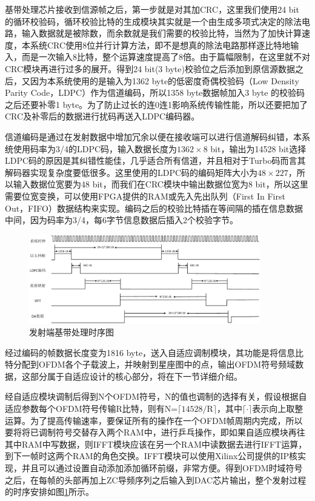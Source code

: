 基带处理芯片接收到信源帧之后，第一步就是对其加CRC，这里我们使用24 bit 的循环校验码，循环校验比特的生成模块其实就是一个由生成多项式决定的除法电路，输入数据就是被除数，而余数就是我们需要的校验比特，当然为了加快计算速度，本系统CRC使用8位并行计算方法，即不是想真的除法电路那样逐比特地输入，而是一次输入8比特，整个运算速度提高了8倍。由于篇幅限制，在这里就不对CRC模块再进行过多的展开。得到24 bit(3 byte)校验位之后添加到原信源数据之后，又因为本系统使用的是输入为1362 byte的低密度奇偶校验码（Low Density Parity Code，LDPC）作为信道编码，所以1358 byte数据帧加入3 byte 的校验码之后还要补零1 byte。为了防止过长的连0连1影响系统传输性能，所以还要把加了CRC及补零后的数据进行扰码再送入LDPC编码器。

信道编码是通过在发射数据中增加冗余以便在接收端可以进行信道解码纠错，本系统使用码率为3/4的LDPC码，输入数据长度为$1362\times 8$ bit，输出为14528 bit选择LDPC码的原因是其纠错性能佳，几乎适合所有信道，并且相对于Turbo码而言其解码器实现复杂度要低很多。这里使用的LDPC码的编码矩阵大小为$48\times 227$，所以输入数据位宽要为48 bit，而我们在CRC模块中输出数据位宽为8 bit，所以这里需要位宽变换，可以使用FPGA提供的RAM或先入先出队列（First In First Out，FIFO）数据结构来实现。编码之后的校验比特插在等间隔的插在信息数据中间，因为码率为3/4，每6字节信息数据后插入2个校验字节。

\begin{figure}[htbp]
\centering
\includegraphics[width=0.9\textwidth]{figures/chapter-5/TimeSchemeTrans.eps}
\caption{发射端基带处理时序图}
\label{fig:TimeSchemeTrans}
\end{figure}
经过编码的帧数据长度变为1816 byte，送入自适应调制模块，其功能是将信息比特分配到OFDM各个子载波上，并映射到星座图中的点，输出OFDM符号频域数据，这部分属于自适应设计的核心部分，将在下一节详细介绍。

经自适应模块调制后得到N个OFDM符号，N的值也调制的选择有关，假设根据自适应参数每个OFDM符号传输R比特，则有N=$\lceil 14528/\text{R} \rceil$，其中$\lceil \cdot \rceil$表示向上取整运算。为了提高传输速率，要保证所有的操作在一个OFDM帧周期内完成，所以要将将已调制符号交替存入两个RAM中，进行乒乓操作，即如果自适应模块再往其中RAM中写数据，则IFFT模块应该在另一个RAM中读数据去进行IFFT运算，到下一帧时这两个RAM的角色交换。IFFT模块可以使用Xilinx公司提供的IP核实现，并且可以通过设置自动添加添加循环前缀，非常方便。得到OFDM时域符号之后，在每帧的头部再加上ZC导频序列之后输入到DAC芯片输出，整个发射过程的时序安排如图\ref{fig:TimeSchemeTrans}所示。
